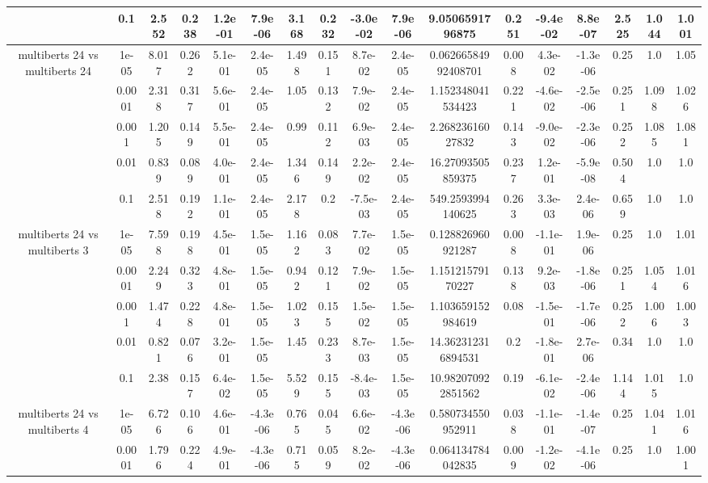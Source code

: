 \begin{tabular}{|c|c|c|c|c|c|c|c|c|c|c|c|c|c|c|c|c|}
 & 0.1 & 2.552 & 0.238 & 1.2e-01 & 7.9e-06 & 3.168 & 0.232 & -3.0e-02 & 7.9e-06 & 9.0506591796875 & 0.251 & -9.4e-02 & 8.8e-07 & 2.525 & 1.044 & 1.001 \\
\hline
\multirow{5}{*}{multiberts 24 vs multiberts 24} & 1e-05 & 8.017 & 0.262 & 5.1e-01 & 2.4e-05 & 1.498 & 0.151 & 8.7e-02 & 2.4e-05 & 0.06266584992408701 & 0.008 & 4.3e-02 & -1.3e-06 & 0.25 & 1.0 & 1.05 \\
 & 0.0001 & 2.318 & 0.317 & 5.6e-01 & 2.4e-05 & 1.05 & 0.132 & 7.9e-02 & 2.4e-05 & 1.152348041534423 & 0.221 & -4.6e-02 & -2.5e-06 & 0.251 & 1.098 & 1.026 \\
 & 0.001 & 1.205 & 0.149 & 5.5e-01 & 2.4e-05 & 0.99 & 0.112 & 6.9e-03 & 2.4e-05 & 2.26823616027832 & 0.143 & -9.0e-02 & -2.3e-06 & 0.252 & 1.085 & 1.081 \\
 & 0.01 & 0.839 & 0.089 & 4.0e-01 & 2.4e-05 & 1.346 & 0.149 & 2.2e-02 & 2.4e-05 & 16.27093505859375 & 0.237 & 1.2e-01 & -5.9e-08 & 0.504 & 1.0 & 1.0 \\
 & 0.1 & 2.518 & 0.192 & 1.1e-01 & 2.4e-05 & 2.178 & 0.2 & -7.5e-03 & 2.4e-05 & 549.2593994140625 & 0.263 & 3.3e-03 & 2.4e-06 & 0.659 & 1.0 & 1.0 \\
\hline
\multirow{5}{*}{multiberts 24 vs multiberts 3} & 1e-05 & 7.598 & 0.198 & 4.5e-01 & 1.5e-05 & 1.162 & 0.083 & 7.7e-02 & 1.5e-05 & 0.128826960921287 & 0.008 & -1.1e-01 & 1.9e-06 & 0.25 & 1.0 & 1.01 \\
 & 0.0001 & 2.249 & 0.323 & 4.8e-01 & 1.5e-05 & 0.942 & 0.121 & 7.9e-02 & 1.5e-05 & 1.15121579170227 & 0.138 & 9.2e-03 & -1.8e-06 & 0.251 & 1.054 & 1.016 \\
 & 0.001 & 1.474 & 0.228 & 4.8e-01 & 1.5e-05 & 1.023 & 0.155 & 1.5e-02 & 1.5e-05 & 1.103659152984619 & 0.08 & -1.5e-01 & -1.7e-06 & 0.252 & 1.006 & 1.003 \\
 & 0.01 & 0.821 & 0.076 & 3.2e-01 & 1.5e-05 & 1.45 & 0.233 & 8.7e-03 & 1.5e-05 & 14.362312316894531 & 0.2 & -1.8e-01 & 2.7e-06 & 0.34 & 1.0 & 1.0 \\
 & 0.1 & 2.38 & 0.157 & 6.4e-02 & 1.5e-05 & 5.529 & 0.155 & -8.4e-03 & 1.5e-05 & 10.982070922851562 & 0.19 & -6.1e-02 & -2.4e-06 & 1.144 & 1.015 & 1.0 \\
\hline
\multirow{5}{*}{multiberts 24 vs multiberts 4} & 1e-05 & 6.726 & 0.106 & 4.6e-01 & -4.3e-06 & 0.765 & 0.045 & 6.6e-02 & -4.3e-06 & 0.580734550952911 & 0.038 & -1.1e-01 & -1.4e-07 & 0.25 & 1.041 & 1.016 \\
 & 0.0001 & 1.796 & 0.224 & 4.9e-01 & -4.3e-06 & 0.715 & 0.059 & 8.2e-02 & -4.3e-06 & 0.064134784042835 & 0.009 & -1.2e-02 & -4.1e-06 & 0.25 & 1.0 & 1.001 \\

\end{tabular}
